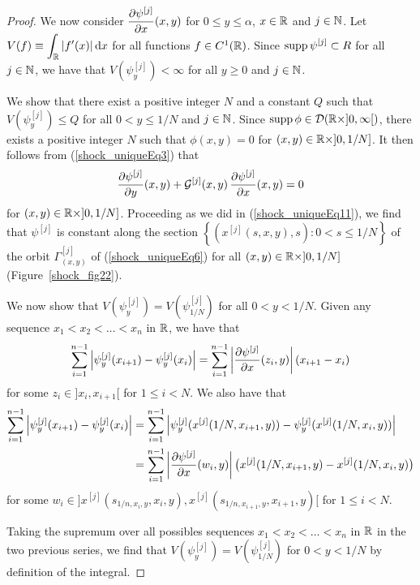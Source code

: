 \begin{proof}
We now consider $\displaystyle \frac{\partial{\psi^{[j]}}}{\partial x}(x,y)$ for
$0 \leq y \leq \alpha$, $x\in \mathbb{R}$ and $j \in \mathbb{N}$.
Let $\displaystyle V(f) \equiv \int_{\mathbb{R}} |f'(x)|\,\mathrm{d}{x}$ for all
functions $f \in C^1(\mathbb{R})$.
Since $\displaystyle \operatorname{supp} \psi^{[j]} \subset R$ for all $j \in \mathbb{N}$,
we have that $\displaystyle V(\psi^{[j]}_y) < \infty$
for all $y \geq 0$ and $ j \in \mathbb{N}$.

We show that there exist a positive integer $N$ and a constant $Q$
such that $\displaystyle V(\psi^{[j]}_y) \leq Q$ for all
$0 < y \leq 1/N$ and $j \in \mathbb{N}$.
Since $\operatorname{supp} \phi \in \mathcal{D}(\mathbb{R}\times ]0,\infty[)$, there exists a
positive integer $N$ such that $\phi(x,y) = 0$ for
$(x,y) \in \mathbb{R} \times ]0,1/N]$.  It then follows from
(\ref{shock_uniqueEq3}) that
\[
\frac{\partial{\psi^{[j]}}}{\partial y}(x,y) + {\cal
  G}^{[j]}(x,y)\,\frac{\partial{\psi^{[j]}}}{\partial x}(x,y) = 0
\]
for $(x,y) \in \mathbb{R} \times ]0,1/N]$.  Proceeding as we did in
(\ref{shock_uniqueEq11}), we find that
$\displaystyle \psi^{[j]}$ is constant along the section
$\left\{ \left(x^{[j]}(s,x,y),s\right) : 0 < s \leq 1/N \right\}$
of the orbit $\Gamma_{(x,y)}^{[j]}$ of (\ref{shock_uniqueEq6}) for all
$(x,y) \in \mathbb{R}\times ]0,1/N]$ (Figure~\ref{shock_fig22}).


We now show that $\displaystyle V(\psi^{[j]}_y) = V(\psi^{[j]}_{1/N})$ for all
$0 < y < 1/N$.   Given any sequence
$x_1 < x_2 < \ldots < x_n$ in $\mathbb{R}$, we have that
\[
\sum_{i=1}^{n-1} \left|\psi^{[j]}_y(x_{i+1}) - \psi^{[j]}_y(x_i)\right|
= \sum_{i=1}^{n-1} \left|\frac{\partial{\psi^{[j]}}}{\partial x}(z_i,y)\right|
(x_{i+1}- x_i)
\]
for some $z_i \in ]x_i,x_{i+1}[$ for $1\leq i < N$.
We also have that
\begin{align*}
\sum_{i=1}^{n-1} \left|\psi^{[j]}_y(x_{i+1}) - \psi^{[j]}_y(x_i)\right|
&= \sum_{i=1}^{n-1} \left|\psi^{[j]}_y(x^{[j]}(1/N,x_{i+1},y))
- \psi^{[j]}_y(x^{[j]}(1/N,x_i,y))\right| \\
&= \sum_{i=1}^{n-1} \left|\frac{\partial{\psi^{[j]}}}{\partial x}(w_i,y)\right|
\big(x^{[j]}(1/N,x_{i+1},y) - x^{[j]}(1/N,x_i,y)\big)
\end{align*}
for some
$w_i \in ]x^{[j]}(s_{1/n,x_i,y},x_i,y),x^{[j]}(s_{1/n,x_{i+1},y},x_{i+1},y)[$
for $1\leq i < N$.

Taking the supremum over all possibles sequences
$x_1 < x_2 < \ldots < x_n$ in $\mathbb{R}$ in the two previous series, we
find that $\displaystyle V(\psi^{[j]}_y) = V(\psi^{[j]}_{1/N})$ for $0<y<1/N$ by
definition of the integral.


\end{proof}
